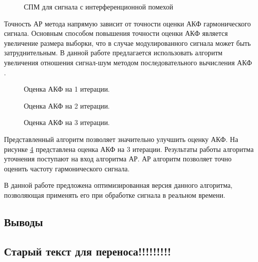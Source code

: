 \begin{figure}[H]
	\center{}
	\caption{СПМ для сигнала с интерференционной помехой}
	\label{pic:lpc_2sat_psd}
\end{figure}

Точность АР метода напрямую зависит от точности оценки АКФ гармонического сигнала.
Основным способом повышения точности оценки АКФ является увеличение размера выборки, что в случае
модулированного сигнала может быть затруднительным. В данной работе предлагается использовать алгоритм
увеличения отношения сигнал-шум методом последовательного вычисления АКФ \cite{ostanin_akf}.

\begin{figure}[H]
	\center{}
	\caption{Оценка АКФ на 1 итерации.}
	\label{pic:lpc_1_iter}
\end{figure}

\begin{figure}[H]
	\center{}
	\caption{Оценка АКФ на 2 итерации.}
	\label{pic:lpc_2_iter}
\end{figure}

\begin{figure}[H]
	\center{}
	\caption{Оценка АКФ на 3 итерации.}
	\label{pic:lpc_3_iter}
\end{figure}

Представленный алгоритм позволяет значительно улучшить оценку АКФ. На рисунке \ref{pic:lpc_3_iter} представлена оценка АКФ на 3 итерации.
Результаты работы алгоритма уточнения поступают на вход алгоритма АР. АР алгоритм позволяет точно оценить частоту гармонического сигнала.

В данной работе предложена оптимизированная версия данного алгоритма, позволяющая применять его при обработке сигнала в реальном времени.

\subsection*{Выводы}


\subsection*{Старый текст для переноса!!!!!!!!!}


